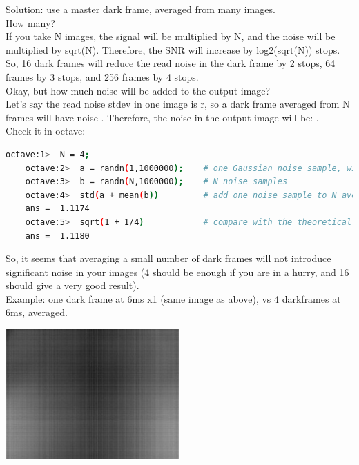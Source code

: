 Solution: use a master dark frame, averaged from many images.\\

How many?\\

If you take N images, the signal will be multiplied by N, and the noise will be multiplied by sqrt(N). Therefore, the SNR will increase by log2(sqrt(N)) stops.\\

So, 16 dark frames will reduce the read noise in the dark frame by 2 stops, 64 frames by 3 stops, and 256 frames by 4 stops.\\

Okay, but how much noise will be added to the output image?\\

Let's say the read noise stdev in one image is r, so a dark frame averaged from N frames will have noise . Therefore, the noise in the output image will be: .\\

Check it in octave:\\ 

\begin{lstlisting}[language=bash,morekeywords=$,keywordstyle=\bfseries,frame=none,xleftmargin=.25in,belowskip=2em, aboveskip=2em]
    octave:1>  N = 4;
    octave:2>  a = randn(1,1000000);    # one Gaussian noise sample, with mean=0 and stdev=1
    octave:3>  b = randn(N,1000000);    # N noise samples
    octave:4>  std(a + mean(b))         # add one noise sample to N averaged noise samples
    ans =  1.1174
    octave:5>  sqrt(1 + 1/4)            # compare with the theoretical result
    ans =  1.1180
\end{lstlisting}

So, it seems that averaging a small number of dark frames will not introduce significant noise in your images (4 should be enough if you are in a hurry, and 16 should give a very good result).\\

Example: one dark frame at 6ms x1 (same image as above), vs 4 darkframes at 6ms, averaged.\\

\begin{center}
\includegraphics[height=5cm]{images/blackframes-gainx1-offset2047-5ms-01}
\end{center}


